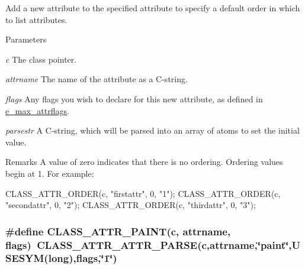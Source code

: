 Add a new attribute to the specified attribute to specify a default order in which to list attributes. 
\begin{DoxyParams}{Parameters}
\item[{\em c}]The class pointer. \item[{\em attrname}]The name of the attribute as a C-\/string. \item[{\em flags}]Any flags you wish to declare for this new attribute, as defined in \hyperlink{group__attr_gaf296cfc6741bb19207f6ed8062809115}{e\_\-max\_\-attrflags}. \item[{\em parsestr}]A C-\/string, which will be parsed into an array of atoms to set the initial value.\end{DoxyParams}
\begin{DoxyRemark}{Remarks}
A value of zero indicates that there is no ordering. Ordering values begin at 1. For example: 
\begin{DoxyCode}
    CLASS_ATTR_ORDER(c, "firstattr",    0, "1");
    CLASS_ATTR_ORDER(c, "secondattr",   0, "2");
    CLASS_ATTR_ORDER(c, "thirdattr",    0, "3");
\end{DoxyCode}
 
\end{DoxyRemark}
\hypertarget{group__attr_gaee847156d2c156b4c9f73652b6059500}{
\subsubsection[{CLASS\_\-ATTR\_\-PAINT}]{\setlength{\rightskip}{0pt plus 5cm}\#define CLASS\_\-ATTR\_\-PAINT(c, \/  attrname, \/  flags)~CLASS\_\-ATTR\_\-ATTR\_\-PARSE(c,attrname,\char`\"{}paint\char`\"{},USESYM(long),flags,\char`\"{}1\char`\"{})}}
\label{group__attr_gaee847156d2c156b4c9f73652b6059500}


